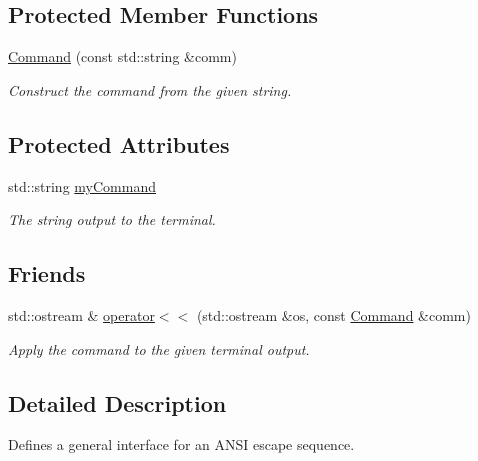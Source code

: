 \subsection*{Protected Member Functions}
\begin{DoxyCompactItemize}
\item 
\hyperlink{class_t_c_o_m_1_1_command_a9f14fb1f231d9c8a7e37bb9e37fedad2}{Command} (const std\-::string \&comm)
\begin{DoxyCompactList}\small\item\em Construct the command from the given string. \end{DoxyCompactList}\end{DoxyCompactItemize}
\subsection*{Protected Attributes}
\begin{DoxyCompactItemize}
\item 
\hypertarget{class_t_c_o_m_1_1_command_a397c781473289aebb99839fd501c970b}{std\-::string \hyperlink{class_t_c_o_m_1_1_command_a397c781473289aebb99839fd501c970b}{my\-Command}}\label{class_t_c_o_m_1_1_command_a397c781473289aebb99839fd501c970b}

\begin{DoxyCompactList}\small\item\em The string output to the terminal. \end{DoxyCompactList}\end{DoxyCompactItemize}
\subsection*{Friends}
\begin{DoxyCompactItemize}
\item 
std\-::ostream \& \hyperlink{class_t_c_o_m_1_1_command_ab31ba205060fc3e683a1b01b627b501f}{operator$<$$<$} (std\-::ostream \&os, const \hyperlink{class_t_c_o_m_1_1_command}{Command} \&comm)
\begin{DoxyCompactList}\small\item\em Apply the command to the given terminal output. \end{DoxyCompactList}\end{DoxyCompactItemize}


\subsection{Detailed Description}
Defines a general interface for an A\-N\-S\-I escape sequence. 

